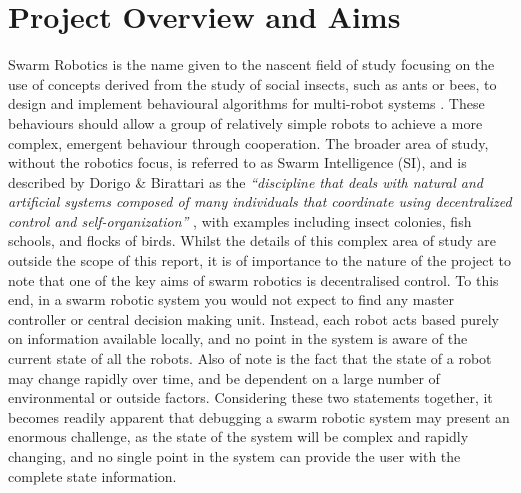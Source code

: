 \documentclass[hidelinks,10pt]{article}
\begin{document}
\section{Project Overview and Aims} \label{Overview}
Swarm Robotics is the name given to the nascent field of study focusing on the use of concepts derived from the study of social insects, such as ants or bees, to design and implement behavioural algorithms for multi-robot systems \cite{InspirationToApplication}. These behaviours should allow a group of relatively simple robots to achieve a more complex, emergent behaviour through cooperation. The broader area of study, without the robotics focus, is referred to as Swarm Intelligence (SI), and is described by Dorigo \& Birattari as the \textit{``discipline that deals with natural and artificial systems composed of many individuals that coordinate using decentralized control and self-organization''} \cite{SwarmIntelligence}, with examples including insect colonies, fish schools, and flocks of birds. Whilst the details of this complex area of study are outside the scope of this report, it is of importance to the nature of the project to note that one of the key aims of swarm robotics is decentralised control. To this end, in a swarm robotic system you would not expect to find any master controller or central decision making unit. Instead, each robot acts based purely on information available locally, and no point in the system is aware of the current state of all the robots. Also of note is the fact that the state of a robot may change rapidly over time, and be dependent on a large number of environmental or outside factors. Considering these two statements together, it becomes readily apparent that debugging a swarm robotic system may present an enormous challenge, as the state of the system will be complex and rapidly changing, and no single point in the system can provide the user with the complete state information. 
\end{document}
